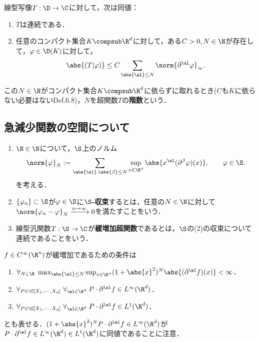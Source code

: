 \documentclass[uplatex,dvipdfmx]{jsreport}
\begin{document}
\begin{proposition}
    線型写像$T:\D\to\C$に対して，次は同値：
    \begin{enumerate}
        \item $T$は連続である．
        \item 任意のコンパクト集合$K\compsub\R^d$に対して，ある$C>0,N\in\N$が存在して，$\varphi\in\D(K)$に対して，
        \[\abs{(T|\varphi)}\le C\sum_{\abs{\al}\le N}\norm{\partial^\al\varphi}_\infty.\]
    \end{enumerate}
    この$N\in\N$がコンパクト集合$K\compsub\R^d$に依らずに取れるとき($C$も$K$に依らない必要はない\cite{Rudin-FunctionalAnalysis}Def.6.8)，$N$を超関数$T$の\textbf{階数}という．
\end{proposition}

\subsection{急減少関数の空間について}

\begin{definition}\mbox{}
    \begin{enumerate}
        \item $\N\in\N$について，$\S$上のノルム
        \[\norm{\varphi}_N:=\sum_{\abs{\al},\abs{\beta}\le N}\sup_{x\in\R^d}\abs{x^\al(\partial^\beta\varphi)(x)},\qquad\varphi\in\S.\]
        を考える．
        \item $\{\varphi_n\}\subset\S$が$\varphi\in\S$に\textbf{$\S$-収束}するとは，任意の$N\in\N$に対して$\norm{\varphi_n-\varphi}_N\xrightarrow{n\to\infty}0$を満たすことをいう．
        \item 線型汎関数$T:\S\to\C$が\textbf{緩増加超関数}であるとは，$\S$の(2)の収束について連続であることをいう．
    \end{enumerate}
\end{definition}
\begin{remarks}
    $f\in C^\infty(\R^n)$が緩増加であるための条件は
    \begin{enumerate}
        \item $\forall_{N\in\N}\;\max_{\abs{\al}\le N}\sup_{x\in\R^n}(1+\abs{x}^2)^N\abs{(\partial^\al f)(x)}<\infty$．
        \item $\forall_{P\in\C[X_1,\cdots,X_d]}\;\forall_{\al\in\N^d}\;P\cdot\partial^\al f\in L^\infty(\R^d)$．
        \item $\forall_{P\in\C[X_1,\cdots,X_d]}\;\forall_{\al\in\N^d}\;P\cdot\partial^\al f\in L^1(\R^d)$．
    \end{enumerate}
    とも表せる．$(1+\abs{x}^2)^NP\cdot\partial^\al f\in L^\infty(\R^d)$が$P\cdot\partial^\al f\in L^\infty(\R^d)\in L^1(\R^d)$に同値であることに注意．
\end{remarks}
\end{document}
